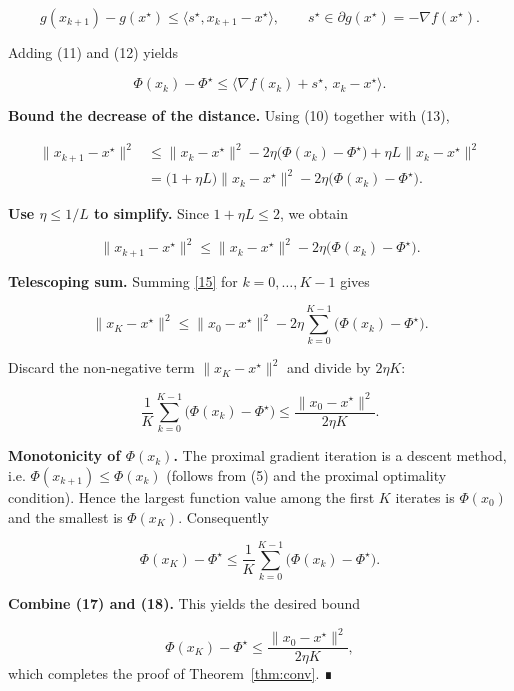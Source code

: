 \documentclass{article}
\begin{document}
\begin{enumerate}[label={[\textbf{Step \arabic*}]}]
\[
g(x_{k+1})-g(x^\star)\le\langle s^\star,x_{k+1}-x^\star\rangle,
\qquad s^\star\in\partial g(x^\star)=-\nabla f(x^\star).
\tag{12}
\]

Adding (11) and (12) yields  

\[
\Phi(x_k)-\Phi^\star\le\langle\nabla f(x_k)+s^\star,\,x_k-x^\star\rangle.
\tag{13}
\]

\item \textbf{Bound the decrease of the distance.} Using (10) together with (13),

\[
\begin{aligned}
\|x_{k+1}-x^\star\|^2
&\le\|x_k-x^\star\|^2-2\eta\bigl(\Phi(x_k)-\Phi^\star\bigr)+\eta L\|x_k-x^\star\|^2\\
&=\bigl(1+\eta L\bigr)\|x_k-x^\star\|^2-2\eta\bigl(\Phi(x_k)-\Phi^\star\bigr).
\end{aligned}
\tag{14}
\]

\item \textbf{Use $\eta\le 1/L$ to simplify.} Since $1+\eta L\le 2$, we obtain  

\[
\|x_{k+1}-x^\star\|^2
\le\|x_k-x^\star\|^2-2\eta\bigl(\Phi(x_k)-\Phi^\star\bigr).
\tag{15}
\]

\item \textbf{Telescoping sum.} Summing \eqref{15} for $k=0,\dots,K-1$ gives  

\[
\|x_{K}-x^\star\|^2
\le\|x_{0}-x^\star\|^2-2\eta\sum_{k=0}^{K-1}\bigl(\Phi(x_k)-\Phi^\star\bigr).
\tag{16}
\]

Discard the non‑negative term $\|x_{K}-x^\star\|^2$ and divide by $2\eta K$:

\[
\frac{1}{K}\sum_{k=0}^{K-1}\bigl(\Phi(x_k)-\Phi^\star\bigr)
\le\frac{\|x_{0}-x^\star\|^2}{2\eta K}.
\tag{17}
\]

\item \textbf{Monotonicity of $\Phi(x_k)$.} The proximal gradient iteration is a descent method, i.e. $\Phi(x_{k+1})\le\Phi(x_k)$ (follows from (5) and the proximal optimality condition). Hence the largest function value among the first $K$ iterates is $\Phi(x_0)$ and the smallest is $\Phi(x_K)$. Consequently  

\[
\Phi(x_K)-\Phi^\star\le\frac{1}{K}\sum_{k=0}^{K-1}\bigl(\Phi(x_k)-\Phi^\star\bigr).
\tag{18}
\]

\item \textbf{Combine (17) and (18).} This yields the desired bound  

\[
\Phi(x_K)-\Phi^\star\le\frac{\|x_{0}-x^\star\|^2}{2\eta K},
\]
which completes the proof of Theorem~\ref{thm:conv}. ∎
\end{enumerate}
\end{document}
